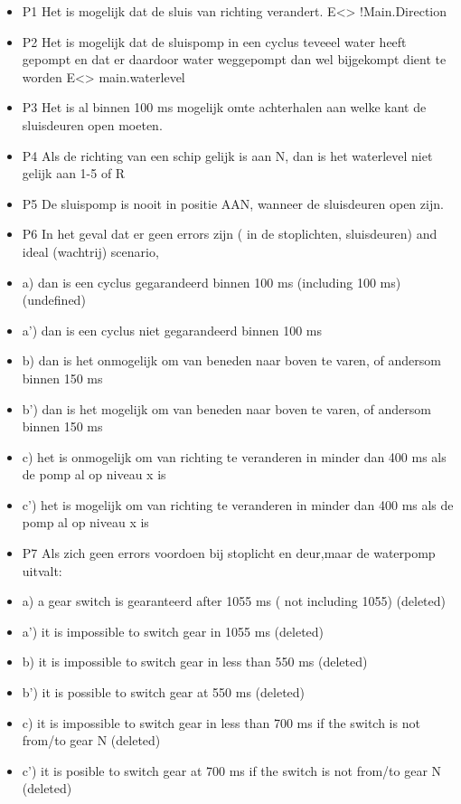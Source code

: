 \begin{itemize}
\item  P1 Het is mogelijk dat de sluis van richting verandert.
  E<> !Main.Direction
\item  P2 Het is mogelijk dat de sluispomp in een cyclus teveeel water heeft gepompt en dat er daardoor water weggepompt dan wel bijgekompt dient te worden
 E<> main.waterlevel
\item  P3 Het is al binnen 100 ms mogelijk omte achterhalen aan welke kant de sluisdeuren  open moeten.
\item  P4 Als de richting van een schip gelijk is aan N, dan is het waterlevel niet gelijk aan 1-5 of R
\item  P5 De sluispomp is nooit in positie AAN, wanneer de sluisdeuren open zijn.
\item  P6 In het geval dat er geen errors zijn (  in de stoplichten, sluisdeuren) and ideal (wachtrij) scenario,
\item  a) dan is een cyclus gegarandeerd binnen 100 ms (including 100 ms) (undefined)
\item  a') dan is een cyclus niet gegarandeerd binnen 100 ms
\item  b)  dan is het onmogelijk om van beneden naar boven te varen, of andersom binnen 150 ms
\item  b') dan is het mogelijk om van beneden naar boven te varen, of andersom binnen 150 ms
\item  c) het is onmogelijk om van richting te veranderen in minder dan 400 ms als de pomp al op niveau x is
\item  c') het is mogelijk om van richting te veranderen in minder dan 400 ms als de pomp al op niveau x is
\item  P7 Als zich geen errors voordoen bij stoplicht en deur,maar de waterpomp uitvalt:
\item  a)  a gear switch is gearanteerd after 1055 ms ( not including  1055)  (deleted)
\item  a') it is impossible  to switch gear in 1055 ms     (deleted)
\item  b) it is  impossible to switch gear in less than 550 ms (deleted)
\item  b') it is possible to switch gear at 550 ms (deleted)
\item  c) it is impossible to switch  gear in  less than 700 ms if the switch is not from/to gear N (deleted)
\item  c') it is posible to switch gear at 700 ms if the switch is not from/to gear N (deleted)
 

\end{itemize}
